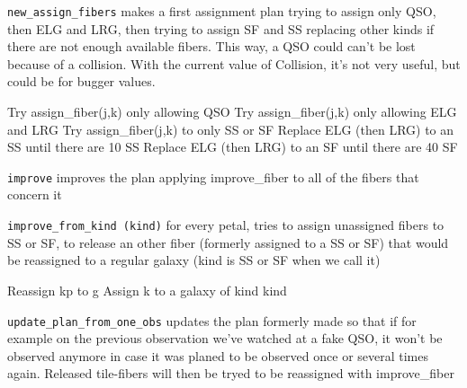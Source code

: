 \documentclass{extarticle}
\begin{document}
\begin{multicols}{2}
{\tt new\_assign\_fibers} makes a first assignment plan trying to assign only QSO, then ELG and LRG, then trying to assign SF and SS replacing other kinds if there are not enough available fibers. This way, a QSO could can't be lost because of a collision. With the current value of Collision, it's not very useful, but could be for bugger values.

\begin{algorithm}[H]
	\caption{New\_assign\_fibers(j0,n)}\label{euclid}
	\begin{algorithmic}[1]
		\State Try assign\_fiber(j,k) only allowing QSO
		\EndFor
		\State Try assign\_fiber(j,k) only allowing ELG and LRG
		\EndFor
		\State Try assign\_fiber(j,k) to only SS or SF
		\EndFor
		\State Replace ELG (then LRG) to an SS until there are 10 SS
		\EndIf
		\State Replace ELG (then LRG) to an SF until there are 40 SF
		\EndIf
		\EndFor
		\EndFor
	\end{algorithmic}
\end{algorithm}

{\tt improve} improves the plan applying improve\_fiber to all of the fibers that concern it

{\tt improve\_from\_kind (kind)} for every petal, tries to assign unassigned fibers to SS or SF, to release an other fiber (formerly assigned to a SS or SF) that would be reassigned to a regular galaxy (kind is SS or SF when we call it)

\begin{algorithm}[H]
	\caption{Improve\_from\_kind (kind,j0,n)}\label{euclid}
	\begin{algorithmic}[1]
		\State Reassign kp to g
		\State Assign k to a galaxy of kind kind
		\EndIf
		\EndFor
		\EndFor
		\EndFor
		\EndFor
		\EndFor
	\end{algorithmic}
\end{algorithm}

{\tt update\_plan\_from\_one\_obs} updates the plan formerly made so that if for example on the previous observation we've watched at a fake QSO, it won't be observed anymore in case it was planed to be observed once or several times again. Released tile-fibers will then be tryed to be reassigned with improve\_fiber


\end{multicols}
\end{document}
